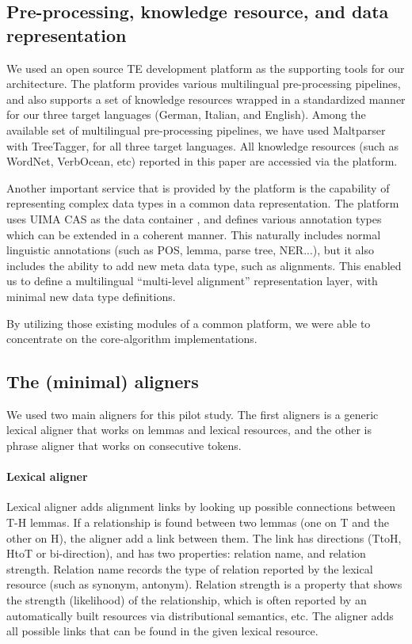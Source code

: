 \documentclass[11pt,letterpaper]{article}
\begin{document}
\subsection{Pre-processing, knowledge resource, and data
  representation}  
We used an open source TE development platform \cite{} as the
supporting tools for our architecture. The platform provides various  
multilingual pre-processing pipelines, and also supports a set of
knowledge resources wrapped in a standardized manner for our three
target languages (German, Italian, and English). Among the available
set of multilingual pre-processing pipelines, we have used Maltparser
with TreeTagger, for all three target languages. All knowledge
resources (such as WordNet, VerbOcean, etc) reported in this paper
are accessied via the platform. 

Another important service that is provided by the platform is the
capability of representing complex data types in a common data
representation. The platform uses UIMA CAS as the data container
\cite{}, and defines various annotation types which can be extended in
a coherent manner. This naturally includes normal linguistic
annotations (such as POS, lemma, parse tree, NER...), but it also
includes the ability to add new meta data type, such as
alignments. This enabled us to define a multilingual ``multi-level
alignment''  representation layer, with minimal new data type
definitions. 

By utilizing those existing modules of a common platform, we were able
to concentrate on the core-algorithm implementations. 

\subsection{The (minimal) aligners}
We used two main aligners for this pilot study. The first aligners is
a generic lexical aligner that works on lemmas and lexical resources,
and the other is phrase aligner that works on consecutive tokens.  

\paragraph{Lexical aligner} Lexical aligner adds alignment links by
looking up possible connections between T-H lemmas. If a relationship
is found between two lemmas (one on T and the other on H), the aligner
add a link between them. The link has directions (TtoH, HtoT or
bi-direction), and has two properties: relation name, and relation
strength. Relation name records the type of relation reported by the
lexical resource (such as synonym, antonym). Relation strength is a
property that shows the strength (likelihood) of the relationship,
which is often reported by an automatically built resources via
distributional semantics, etc. The aligner adds all possible links
that can be found in the given lexical resource. 
\end{document}
